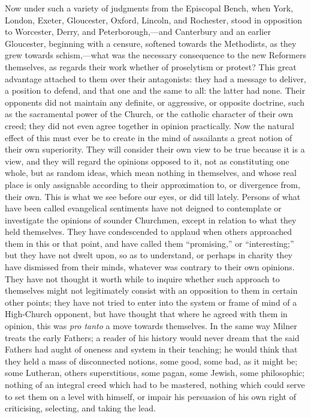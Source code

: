 Now under such a variety of judgments from the
Episcopal Bench, when York, London, Exeter, Gloucester, Oxford,
Lincoln, and Rochester, stood in opposition to Worcester, Derry, and
Peterborough,—and Canterbury and an earlier Gloucester,
beginning with a censure, softened towards the Methodists, as they
grew towards schism,—what was the necessary consequence to the new
Reformers themselves, as regards their work whether of proselytism or
protest? This great advantage attached to them over their antagonists:
they had a message to deliver, a position to defend, and that one and
the same to all: the latter had none. Their opponents did not maintain
any definite, or aggressive, or opposite doctrine, such as the
sacramental power of the Church, or the catholic character of their
own creed; they did not even agree together in opinion practically.
Now the natural effect of this must ever be to create in the mind of
assailants a great notion of their own superiority. They will consider
their own view to be true because it is a view, and they will regard
the opinions opposed to it, not as constituting one whole, but as
random ideas, which mean nothing in themselves, and whose real place
is only assignable according to their approximation to, or divergence
from, their own. This is what we see before our eyes, or did till
lately. Persons of what have been called evangelical sentiments have
not deigned to contemplate or investigate the opinions of sounder
Churchmen, except in relation to what they held themselves. They have
condescended to applaud when others approached them in this or that
point, and have called them ``promising,'' or ``interesting;'' but they
have not dwelt upon, so as to understand, or perhaps in charity they
have dismissed from their minds, whatever was contrary to their own
opinions. They have not thought it worth while to inquire whether such
approach to themselves might not legitimately consist with an
opposition to them in certain other points; they have not tried to
enter into the system or frame of mind of a High-Church
opponent, but have thought that where he agreed with them in opinion,
this was \emph{pro tanto} a move towards themselves. In the same way
Milner treats the early Fathers; a reader of his history would never
dream that the said Fathers had aught of oneness and system in their
teaching; he would think that they held a mass of disconnected
notions, some good, some bad, as it might be; some Lutheran, others
superstitious, some pagan, some Jewish, some philosophic; nothing of
an integral creed which had to be mastered, nothing which could serve
to set them on a level with himself, or impair his persuasion of his
own right of criticising, selecting, and taking the lead.


